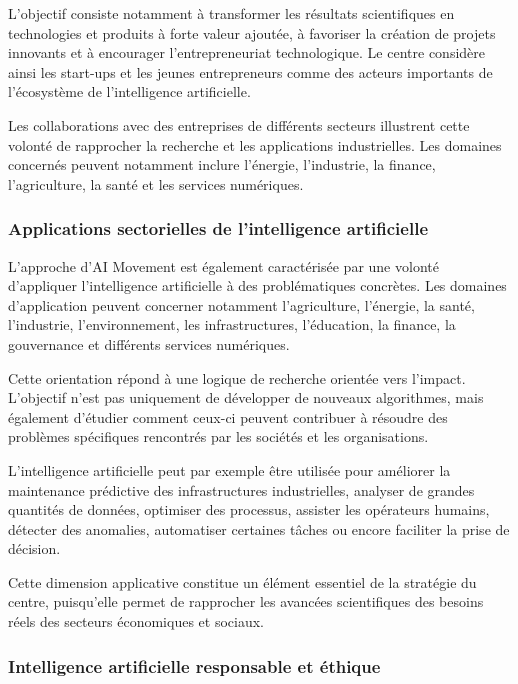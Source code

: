 \documentclass[12pt,a4paper]{report}
\begin{document}
L'objectif consiste notamment à transformer les résultats scientifiques en technologies et produits à forte valeur ajoutée, à favoriser la création de projets innovants et à encourager l'entrepreneuriat technologique. Le centre considère ainsi les start-ups et les jeunes entrepreneurs comme des acteurs importants de l'écosystème de l'intelligence artificielle.

Les collaborations avec des entreprises de différents secteurs illustrent cette volonté de rapprocher la recherche et les applications industrielles. Les domaines concernés peuvent notamment inclure l'énergie, l'industrie, la finance, l'agriculture, la santé et les services numériques.

\subsubsection{Applications sectorielles de l'intelligence artificielle}

L'approche d'AI Movement est également caractérisée par une volonté d'appliquer l'intelligence artificielle à des problématiques concrètes. Les domaines d'application peuvent concerner notamment l'agriculture, l'énergie, la santé, l'industrie, l'environnement, les infrastructures, l'éducation, la finance, la gouvernance et différents services numériques.

Cette orientation répond à une logique de recherche orientée vers l'impact. L'objectif n'est pas uniquement de développer de nouveaux algorithmes, mais également d'étudier comment ceux-ci peuvent contribuer à résoudre des problèmes spécifiques rencontrés par les sociétés et les organisations.

L'intelligence artificielle peut par exemple être utilisée pour améliorer la maintenance prédictive des infrastructures industrielles, analyser de grandes quantités de données, optimiser des processus, assister les opérateurs humains, détecter des anomalies, automatiser certaines tâches ou encore faciliter la prise de décision.

Cette dimension applicative constitue un élément essentiel de la stratégie du centre, puisqu'elle permet de rapprocher les avancées scientifiques des besoins réels des secteurs économiques et sociaux.

\subsubsection{Intelligence artificielle responsable et éthique}
\end{document}
